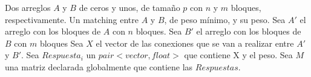 \documentclass[12pt,a4,paper]{article}
\begin{document}
\begin{algorithmic}[1]
    \REQUIRE Dos arreglos $A$ y $B$ de ceros y unos, de tamaño $p$ con $n$ y $m$ bloques, respectivamente.
    \ENSURE Un matching entre $A$ y $B$, de peso mínimo, y su peso. \newline \newline
        \STATE Sea $A'$ el arreglo con los bloques de $A$ con $n$ bloques.
        \STATE Sea $B'$ el arreglo con los bloques de $B$ con $m$ bloques
        \STATE Sea $X$ el vector de las conexiones que se van a realizar entre $A'$ y $B'$.
        \STATE Sea $Respuesta_i$ un $pair<vector, float>$ que contiene X y el peso.
        \STATE Sea $M$ una matriz declarada globalmente que contiene las $Respuestas$.
        

\end{algorithmic}
\end{document}
